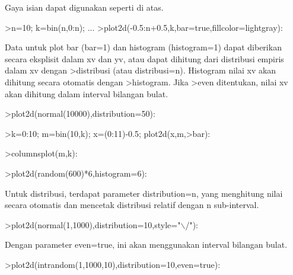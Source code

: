 \documentclass[a4paper,10pt]{article}
\begin{document}
\begin{eulernotebook}
\begin{eulercomment}
\begin{eulercomment}
\begin{eulercomment}
\begin{eulercomment}
\begin{eulercomment}
\begin{eulercomment}
\begin{eulercomment}
Gaya isian dapat digunakan seperti di atas.
\end{eulercomment}
\begin{eulerprompt}
>n=10; k=bin(n,0:n); ...
>plot2d(-0.5:n+0.5,k,bar=true,fillcolor=lightgray):
\end{eulerprompt}
\begin{eulercomment}
Data untuk plot bar (bar=1) dan histogram (histogram=1) dapat
diberikan secara eksplisit dalam xv dan yv, atau dapat dihitung dari
distribusi empiris dalam xv dengan \textgreater{}distribusi (atau distribusi=n).
Histogram nilai xv akan dihitung secara otomatis dengan \textgreater{}histogram.
Jika \textgreater{}even ditentukan, nilai xv akan dihitung dalam interval bilangan
bulat.
\end{eulercomment}
\begin{eulerprompt}
>plot2d(normal(10000),distribution=50):
\end{eulerprompt}
\begin{eulerprompt}
>k=0:10; m=bin(10,k); x=(0:11)-0.5; plot2d(x,m,>bar):
\end{eulerprompt}
\begin{eulerprompt}
>columnsplot(m,k):
\end{eulerprompt}
\begin{eulerprompt}
>plot2d(random(600)*6,histogram=6):
\end{eulerprompt}
\begin{eulercomment}
Untuk distribusi, terdapat parameter distribution=n, yang menghitung
nilai secara otomatis dan mencetak distribusi relatif dengan n
sub-interval.
\end{eulercomment}
\begin{eulerprompt}
>plot2d(normal(1,1000),distribution=10,style="\(\backslash\)/"):
\end{eulerprompt}
\begin{eulercomment}
Dengan parameter even=true, ini akan menggunakan interval bilangan
bulat.
\end{eulercomment}
\begin{eulerprompt}
>plot2d(intrandom(1,1000,10),distribution=10,even=true):

\end{eulerprompt}
\end{eulercomment}
\end{eulercomment}
\end{eulercomment}
\end{eulercomment}
\end{eulercomment}
\end{eulercomment}
\end{eulernotebook}
\end{document}
